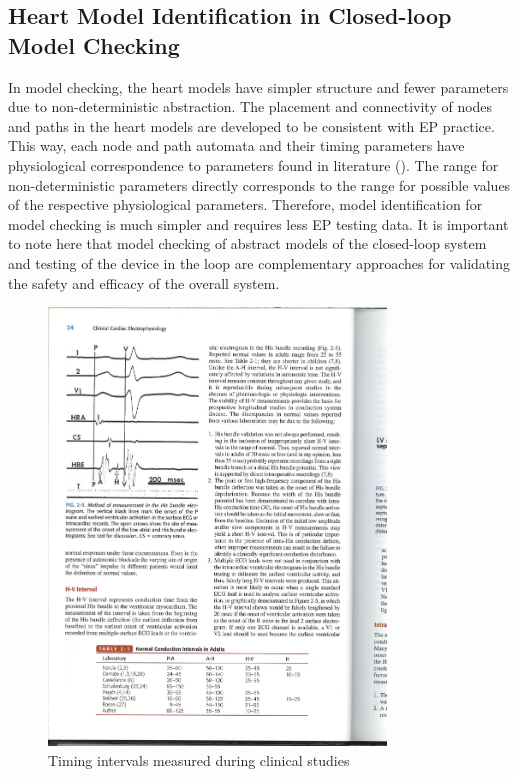 \subsection{Heart Model Identification in Closed-loop Model Checking}
In model checking, the heart models have simpler structure and fewer parameters due to non-deterministic abstraction. The placement and connectivity of nodes and paths in the heart models are developed to be consistent with EP practice. This way, each node and path automata and their timing parameters have physiological correspondence to parameters found in literature (). The range for non-deterministic parameters directly corresponds to the range for possible values of the respective physiological parameters. Therefore, model identification for model checking is much simpler and requires less EP testing data. It is important to note here that model checking of abstract models of the closed-loop system and testing of the device in the loop are complementary approaches for validating the safety and efficacy of the overall system. 

\begin{figure}[!t]
\centering
		\includegraphics[width=0.8\textwidth]{figs/intervals.pdf}
		
\caption{\small Timing intervals measured during clinical studies \cite{josephson}}
\label{fig:intervals}
\end{figure} 



